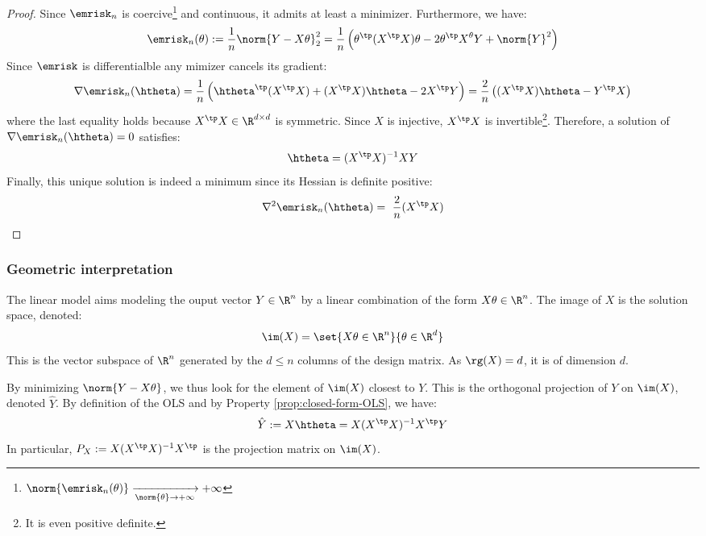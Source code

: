 \documentclass[toc, titlepaged]{../cs-classes/cs-classes}
\begin{document}
\begin{proof}
    Since $\emrisk_n$ is coercive\footnote{$\norm{\emrisk_n(\theta)} \xrightarrow[\norm{\theta}\to+\infty]{} +\infty$} and continuous, it admits at least a minimizer. Furthermore, we have:
    \begin{equation*}
        \emrisk_n(\theta) := \frac{1}{n}\norm{Y-X\theta}^2_2 = \frac{1}{n}\left(\theta^\tp(X^\tp X)\theta - 2\theta^\tp X^\theta Y+\norm{Y}^2\right)
    \end{equation*}
    Since $\emrisk$ is differentialble any mimizer cancels its gradient:
    \begin{equation*}
        \nabla\emrisk_n(\htheta) = \frac{1}{n}\left(\htheta^\tp(X^\tp X) + (X^\tp X)\htheta - 2X^\tp Y\right) = \frac{2}{n}\left((X^\tp X)\htheta - Y^\tp X\right)
    \end{equation*}
    where the last equality holds because $X^\tp X\in\R^{d\times d}$ is symmetric. Since $X$ is injective, $X^\tp X$ is invertible\footnote{It is even positive definite.}. Therefore, a solution of $\nabla\emrisk_n(\htheta)=0$ satisfies:
    \begin{equation*}
        \htheta = (X^\tp X)^{-1}XY
    \end{equation*}
    Finally, this unique solution is indeed a minimum since its Hessian is definite positive:
    \begin{equation*}
        \nabla^2\emrisk_n(\htheta) = \frac{2}{n}(X^\tp X)
    \end{equation*}
\end{proof}

\subsubsection{Geometric interpretation}
The linear model aims modeling the ouput vector $Y\in\R^n$ by a linear combination of the form $X\theta\in\R^n$. The image of $X$ is the solution space, denoted:
\begin{equation*}
    \im(X)=\set{X\theta\in\R^n}{\theta\in\R^d}
\end{equation*}
This is the vector subspace of $\R^n$ generated by the $d\leq n$ columns of the design matrix. As $\rg(X)=d$, it is of dimension $d$.

By minimizing $\norm{Y-X\theta}$, we thus look for the element of $\im(X)$ closest to $Y$. This is the orthogonal projection of $Y$ on $\im(X)$, denoted $\hat{Y}$. By definition of the OLS and by Property \ref{prop:closed-form-OLS}, we have:
\begin{equation*}
    \hat{Y} := X\htheta = X(X^\tp X)^{-1}X^\tp Y
\end{equation*}
In particular, $P_X:=X(X^\tp X)^{-1}X^\tp$ is the projection matrix on $\im(X)$.
\end{document}
